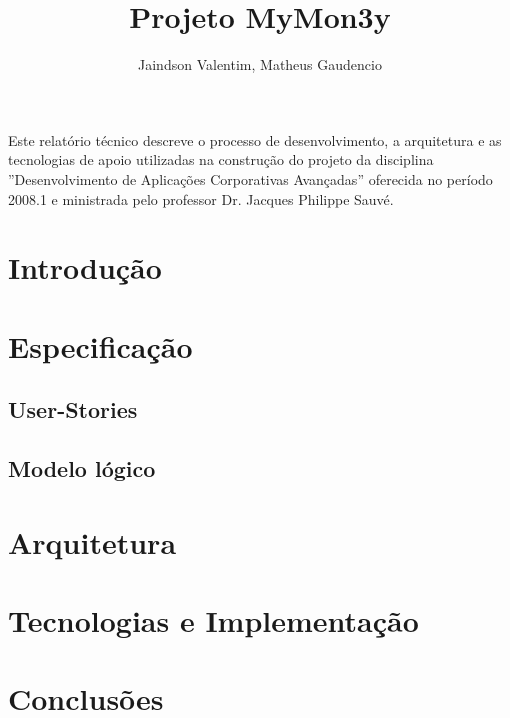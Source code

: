 \documentclass[12pt]{article}
\title{Projeto MyMon3y}
\author{Jaindson Valentim\inst{1}, Matheus Gaudencio\inst{1}}
\begin{document}
 

\maketitle

\begin{resumo}
Este relatório técnico descreve o processo de desenvolvimento, a arquitetura e as tecnologias de apoio utilizadas na construção do projeto da disciplina ''Desenvolvimento de Aplicações Corporativas Avançadas'' oferecida no período 2008.1 e ministrada pelo professor Dr. Jacques Philippe Sauvé.
\end{resumo}

\section{Introdução}
\label{intro}


\section{Especificação}
\label{especificacao}

\subsection{User-Stories}
\label{us}

\subsection{Modelo lógico}
\label{modelo}

\section{Arquitetura}
\label{arquitetura}

\section{Tecnologias e Implementação}
\label{tecnologias}

\section{Conclusões}
\label{conclusao}



\end{document}
